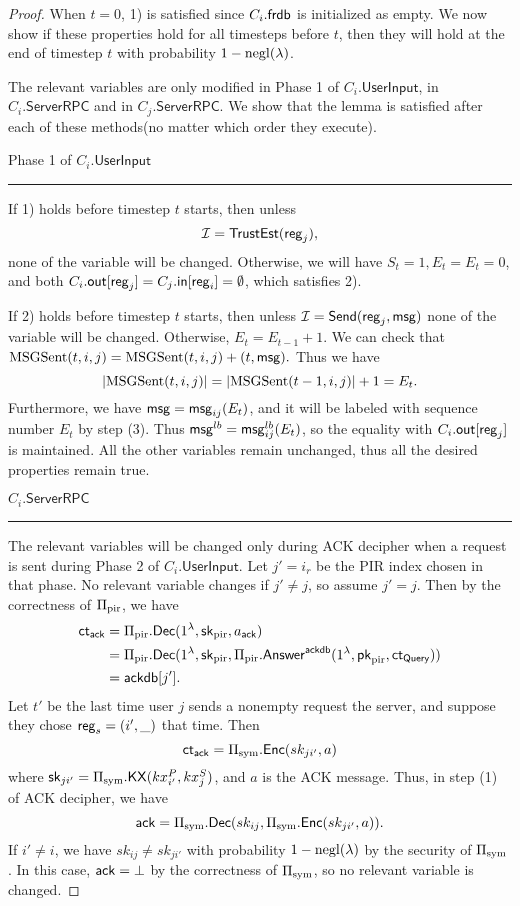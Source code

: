 \begin{proof}
When $t = 0$, 1) is satisfied since $C_i.\mathsf{frdb}$ is initialized as empty. We now show if these properties hold for all timesteps before $t$, then they will hold at the end of timestep $t$ with probability $1 - \operatorname{negl}(\lambda)$.

The relevant variables are only modified in Phase 1 of $C_i.\mathsf{UserInput}$, in $C_i.\mathsf{ServerRPC}$ and in $C_j.\mathsf{ServerRPC}$. We show that the lemma is satisfied after each of these methods(no matter which order they execute).

Phase 1 of $C_i.\mathsf{UserInput}$
\hrule
If 1) holds before timestep $t$ starts, then unless 
$$\mathcal{I} = \mathsf{TrustEst}(\mathsf{reg}_j),$$
none of the variable will be changed. Otherwise, we will have $S_t = 1, E_t = E_t = 0$, and both $C_i.\mathsf{out}[\mathsf{reg}_j] = C_j.\mathsf{in}[\mathsf{reg}_i] = \emptyset$, which satisfies 2).

If 2) holds before timestep $t$ starts, then unless $\mathcal{I} = \mathsf{Send}(\mathsf{reg}_j, \mathsf{msg})$ none of the variable will be changed. Otherwise, $E_t = E_{t - 1} + 1$. We can check that
$\text{MSGSent}(t, i, j) = \text{MSGSent}(t, i, j) + (t, \mathsf{msg}).$
Thus we have
$$\left| \text{MSGSent}(t, i, j) \right| = \left| \text{MSGSent}(t - 1, i, j) \right| + 1 = E_t.$$
Furthermore, we have $\mathsf{msg} = \mathsf{msg}_{ij}(E_t)$, and it will be labeled with sequence number $E_t$ by step (3). Thus $\mathsf{msg}^{lb} = \mathsf{msg}^{lb}_{ij}(E_t)$, so the equality with $C_i.\mathsf{out}[\mathsf{reg}_j]$ is maintained. All the other variables remain unchanged, thus all the desired properties remain true.

\vspace{10pt}
$C_i.\mathsf{ServerRPC}$
\hrule
The relevant variables will be changed only during ACK decipher when a request is sent during Phase 2 of $C_i.\mathsf{UserInput}$. Let $j' = i_r$ be the PIR index chosen in that phase. No relevant variable changes if $j' \neq j$, so assume $j' = j$. Then by the correctness of $\Pi_{\text{pir}}$, we have
\begin{align*}
 \mathsf{ct}_{\mathsf{ack}} &= \Pi_{\text{pir}}.\mathsf{Dec}(1^{\lambda}, {\mathsf{sk}}_{\text{pir}}, a_{\mathsf{ack}})   \\
 &= \Pi_{\text{pir}}.\mathsf{Dec}(1^{\lambda}, {\mathsf{sk}}_{\text{pir}}, \Pi_{\text{pir}}.\mathsf{Answer}^{\mathsf{ackdb}}(1^{\lambda}, \mathsf{pk}_{\text{pir}}, \mathsf{ct}_{\mathsf{Query}})) \\
 &= \mathsf{ackdb}[j'].
\end{align*}
Let $t'$ be the last time user $j$ sends a nonempty request the server, and suppose they chose $\mathsf{reg}_s = (i', \_)$ that time. Then
$$\mathsf{ct}_{\mathsf{ack}} = \Pi_{\text{sym}}.\mathsf{Enc}(sk_{ji'}, a)$$
where ${\mathsf{sk}}_{ji'} = \Pi_{\text{sym}}.\mathsf{KX}(kx_{i'}^P, kx_{j}^S)$, and $a$ is the ACK message. Thus, in step (1) of ACK decipher, we have
$$\mathsf{ack} = \Pi_{\text{sym}}.\mathsf{Dec}(sk_{ij}, \Pi_{\text{sym}}.\mathsf{Enc}(sk_{ji'}, a)).$$
If $i' \neq i$, we have $sk_{ij} \neq sk_{ji'}$ with probability $1 - \operatorname{negl}(\lambda)$ by the security of $\Pi_{\text{sym}}$. In this case, $\mathsf{ack} = \bot$ by the correctness of $\Pi_{\text{sym}}$, so no relevant variable is changed. 


\end{proof}
